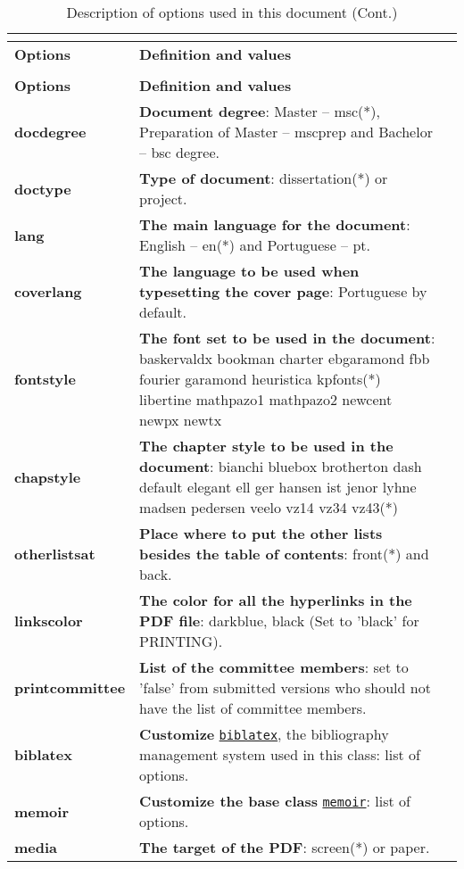 \begin{xltabular}{\linewidth}{ >{\bfseries}l   X }
\caption{Description of options used in this document}
\label{tab:vardescription}                                  
\addtocounter{table}{-1}                  \\
    \toprule
\textbf{Options} & \textbf{Definition and values}  \\
    \midrule
\endfirsthead
\caption[]{Description of options used in this document (Cont.)} \\
    \toprule
\textbf{Options} & \textbf{Definition and values}      \\
    \midrule
\endhead
\endfoot
    \bottomrule
\endlastfoot
docdegree   &  \textbf{Document degree}: Master -- msc(*), Preparation of Master -- mscprep and Bachelor -- bsc degree. \\ \midrule
doctype & \textbf{Type of document}: dissertation(*) or project. \\ \midrule
lang    &  \textbf{The main language for the document}: English -- en(*) and Portuguese -- pt.  \\  \midrule
coverlang   &  \textbf{The language to be used when typesetting the cover page}: Portuguese by default.  \\  \midrule
fontstyle & \textbf{The font set to be used in the document}: baskervaldx bookman charter ebgaramond fbb fourier garamond heuristica kpfonts(*) libertine mathpazo1 mathpazo2 newcent newpx newtx  \\  \midrule
chapstyle   & \textbf{The chapter style to be used in the document}: bianchi bluebox brotherton dash default elegant ell ger hansen ist jenor lyhne madsen pedersen veelo vz14 vz34 vz43(*) \\  \midrule
otherlistsat &   \textbf{Place where to put the other lists besides the table of contents}: front(*) and back. \\  \midrule
linkscolor & \textbf{The color for all the hyperlinks in the PDF file}: darkblue, black (Set to 'black' for PRINTING). \\ \midrule
printcommittee &  \textbf{List of the committee members}: set to 'false' from submitted versions who should not have the list of committee members.   \\ \midrule
biblatex  & \textbf{Customize} \href{https://ctan.org/pkg/biblatex?lang=en}{\texttt{biblatex}}, the bibliography management system used in this class: list of options.  \\ \midrule
memoir  & \textbf{Customize the base class} \href{https://ctan.math.illinois.edu/macros/latex/contrib/memoir/memman.pdf}{\texttt{memoir}}: list of options.  \\ \midrule
media  & \textbf{The target of the PDF}: screen(*) or paper.\\
\bottomrule
\end{xltabular}

